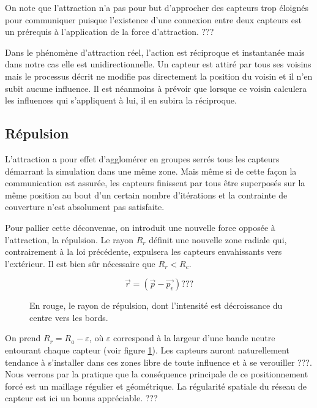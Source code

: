 \documentclass[10pt]{article}
\begin{document}
\begin{multicols}{2}
\begin{figure}[H]
\end{figure}

On note que l'attraction n'a pas pour but d'approcher des capteurs
trop éloignés pour communiquer puisque l'existence d'une connexion
entre deux capteurs est un prérequis à l'application de la force
d'attraction. ???

Dans le phénomène d'attraction réel, l'action est réciproque et
instantanée mais dans notre cas elle est unidirectionnelle. Un capteur
est attiré par tous ses voisins mais le processus décrit ne modifie
pas directement la position du voisin et il n'en subit aucune
influence. Il est néanmoins à prévoir que lorsque ce voisin calculera
les influences qui s'appliquent à lui, il en subira la réciproque.

\subsection*{Répulsion}

L'attraction a pour effet d'agglomérer en groupes serrés tous les
capteurs démarrant la simulation dans une même zone. Mais même si de
cette façon la communication est assurée, les capteurs finissent par
tous être superposés sur la même position au bout d'un certain nombre
d'itérations et la contrainte de couverture n'est absolument pas
satisfaite.

Pour pallier cette déconvenue, on introduit une nouvelle force opposée
à l'attraction, la répulsion. Le rayon $R_r$ définit une nouvelle zone
radiale qui, contrairement à la loi précédente, expulsera les capteurs
envahissants vers l'extérieur. Il est bien sûr nécessaire que $R_r <
R_c$.

$$
\vec{r} = (\vec{p} - \vec{p_v}) ???
$$

\begin{figure}[H]

  \centering

  

  \caption{En rouge, le rayon de répulsion, dont l'intensité est
    décroissance du centre vers les bords.}
  \label{repulsion}

\end{figure}

On prend $R_r = R_a - \varepsilon$, o\`u $\varepsilon$ correspond à la
largeur d'une bande neutre entourant chaque capteur (voir figure
\ref{repulsion}). Les capteurs auront naturellement tendance à
s'installer dans ces zones libre de toute influence et à se verouiller
???. Nous verrons par la pratique que la conséquence principale de ce
positionnement forcé est un maillage régulier et géométrique. La
régularité spatiale du réseau de capteur est ici un bonus
appréciable. ???


\end{multicols}
\end{document}
